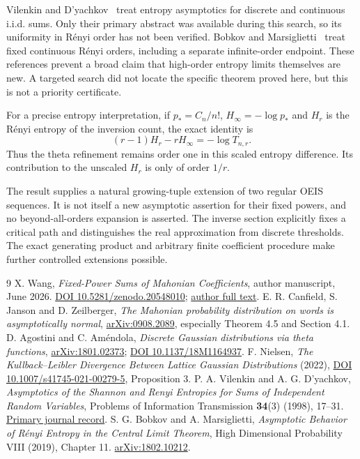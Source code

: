 \documentclass[11pt]{article}
\begin{document}
Vilenkin and D'yachkov~\cite{vd} treat entropy asymptotics for discrete and continuous i.i.d. sums. Only their primary abstract was available during this search, so its uniformity in R\'enyi order has not been verified. Bobkov and Marsiglietti~\cite{bm} treat fixed continuous R\'enyi orders, including a separate infinite-order endpoint. These references prevent a broad claim that high-order entropy limits themselves are new. A targeted search did not locate the specific theorem proved here, but this is not a priority certificate.

For a precise entropy interpretation, if $p_*=C_n/n!$, $H_\infty=-\log p_*$ and $H_r$ is the R\'enyi entropy of the inversion count, the exact identity is
\[
 (r-1)H_r-rH_\infty=-\log T_{n,r}.
\]
Thus the theta refinement remains order one in this scaled entropy difference. Its contribution to the unscaled $H_r$ is only of order $1/r$.

The result supplies a natural growing-tuple extension of two regular OEIS sequences. It is not itself a new asymptotic assertion for their fixed powers, and no beyond-all-orders expansion is asserted. The inverse section explicitly fixes a critical path and distinguishes the real approximation from discrete thresholds. The exact generating product and arbitrary finite coefficient procedure make further controlled extensions possible.

\begin{thebibliography}{9}
 X. Wang, \emph{Fixed-Power Sums of Mahonian Coefficients}, author manuscript, June 2026. \href{https://doi.org/10.5281/zenodo.20548010}{DOI 10.5281/zenodo.20548010}; \href{https://www.researchgate.net/publication/406002366_Fixed-Power_Sums_of_Mahonian_Coefficients}{author full text}.
 E. R. Canfield, S. Janson and D. Zeilberger, \emph{The Mahonian probability distribution on words is asymptotically normal}, \href{https://arxiv.org/abs/0908.2089}{arXiv:0908.2089}, especially Theorem 4.5 and Section 4.1.
 D. Agostini and C. Am\'endola, \emph{Discrete Gaussian distributions via theta functions}, \href{https://arxiv.org/abs/1801.02373}{arXiv:1801.02373}; \href{https://doi.org/10.1137/18M1164937}{DOI 10.1137/18M1164937}.
 F. Nielsen, \emph{The Kullback--Leibler Divergence Between Lattice Gaussian Distributions} (2022), \href{https://doi.org/10.1007/s41745-021-00279-5}{DOI 10.1007/s41745-021-00279-5}, Proposition 3.
 P. A. Vilenkin and A. G. D'yachkov, \emph{Asymptotics of the Shannon and Renyi Entropies for Sums of Independent Random Variables}, Problems of Information Transmission \textbf{34}(3) (1998), 17--31. \href{https://www.mathnet.ru/eng/ppi413}{Primary journal record}.
 S. G. Bobkov and A. Marsiglietti, \emph{Asymptotic Behavior of R\'enyi Entropy in the Central Limit Theorem}, High Dimensional Probability VIII (2019), Chapter 11. \href{https://arxiv.org/abs/1802.10212}{arXiv:1802.10212}.
\end{thebibliography}
\end{document}
